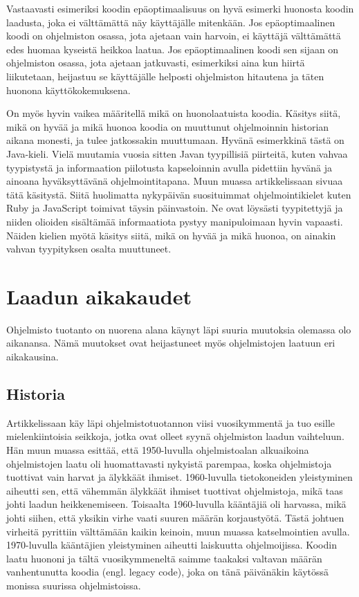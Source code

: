 \documentclass[a4paper]{article}
\begin{document}
Vastaavasti esimeriksi koodin epäoptimaalisuus on hyvä esimerki huonosta koodin laadusta, joka ei välttämättä näy käyttäjälle mitenkään. Jos epäoptimaalinen koodi on ohjelmiston osassa, jota ajetaan vain harvoin, ei käyttäjä välttämättä edes huomaa kyseistä heikkoa laatua. Jos epäoptimaalinen koodi sen sijaan on ohjelmiston osassa, jota ajetaan jatkuvasti, esimerkiksi aina kun hiirtä liikutetaan, heijastuu se käyttäjälle helposti ohjelmiston hitautena ja täten huonona käyttökokemuksena.

On myös hyvin vaikea määritellä mikä on huonolaatuista koodia. Käsitys siitä, mikä on hyvää ja mikä huonoa koodia on muuttunut ohjelmoinnin historian aikana monesti, ja tulee jatkossakin muuttumaan. Hyvänä esimerkkinä tästä on Java-kieli. Vielä muutamia vuosia sitten Javan tyypillisiä piirteitä, kuten vahvaa tyypistystä ja informaation 
piilotusta kapseloinnin avulla pidettiin hyvänä ja ainoana hyväksyttävänä ohjelmointitapana. Muun muassa \citet{whittaker2002} artikkelissaan sivuaa tätä käsitystä. Siitä huolimatta nykypäivän suosituimmat ohjelmointikielet kuten Ruby ja JavaScript toimivat täysin päinvastoin. Ne ovat löysästi tyypitettyjä ja niiden olioiden sisältämää informaatiota pystyy manipuloimaan hyvin vapaasti. Näiden kielien myötä käsitys siitä, mikä on hyvää ja mikä huonoa, on ainakin vahvan tyypityksen osalta muuttuneet.

\section{Laadun aikakaudet}

Ohjelmisto tuotanto on nuorena alana käynyt läpi suuria muutoksia olemassa olo aikanansa. Nämä muutokset ovat heijastuneet myös ohjelmistojen laatuun eri aikakausina.

\subsection{Historia}

Artikkelissaan \citet{whittaker2002} käy läpi ohjelmistotuotannon viisi vuosikymmentä ja tuo esille mielenkiintoisia seikkoja, jotka ovat olleet syynä ohjelmiston laadun vaihteluun. Hän muun muassa esittää, että 1950-luvulla ohjelmistoalan alkuaikoina ohjelmistojen laatu oli huomattavasti nykyistä parempaa, koska ohjelmistoja tuottivat vain harvat ja älykkäät ihmiset. 1960-luvulla tietokoneiden yleistyminen aiheutti sen, että vähemmän älykkäät ihmiset tuottivat ohjelmistoja, mikä taas johti laadun heikkenemiseen. Toisaalta 1960-luvulla kääntäjiä oli harvassa, mikä johti siihen, että yksikin virhe vaati suuren määrän korjaustyötä. Tästä johtuen virheitä pyrittiin välttämään kaikin keinoin, muun muassa katselmointien avulla. 1970-luvulla kääntäjien yleistyminen aiheutti laiskuutta ohjelmoijissa. Koodin laatu huononi ja tältä vuosikymmeneltä saimme taakaksi valtavan määrän vanhentunutta koodia (engl. legacy code), joka on tänä päivänäkin käytössä monissa suurissa ohjelmistoissa. \citep{whittaker2002}
\end{document}
